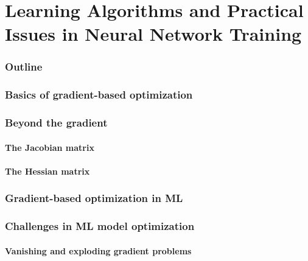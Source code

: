 \renewcommand{\thispart}{4 }
\renewcommand{\thispartname}{Learning Algorithms and Practical Issues in Neural Network Training}

\part{\thispartname}

\section{Outline}






\section{Basics of gradient-based optimization}

\section{Beyond the gradient}
\subsection{The Jacobian matrix}

\subsection{The Hessian matrix}


\section{Gradient-based optimization in ML}


\section{Challenges in ML model optimization}

\subsection{Vanishing and exploding gradient problems}

